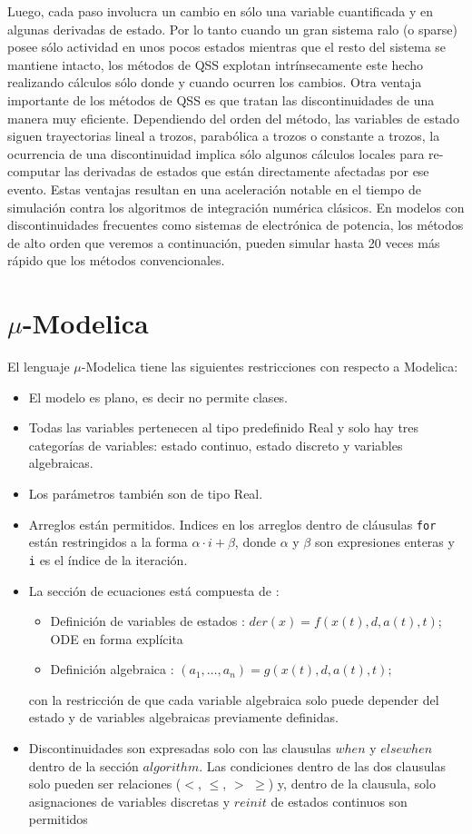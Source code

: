 	Luego, cada paso involucra un cambio en sólo una variable cuantificada y en algunas derivadas de estado. 
	Por lo tanto cuando un gran sistema ralo (o sparse) posee sólo actividad en unos pocos estados mientras que el resto del sistema se mantiene 
	intacto, los métodos de QSS explotan intrínsecamente este hecho realizando cálculos sólo donde y cuando ocurren los cambios.
	Otra ventaja importante de los métodos de QSS es que tratan las discontinuidades de una manera muy eficiente. Dependiendo del orden del método, 
	las variables de estado siguen trayectorias lineal a trozos, parabólica a trozos o constante a trozos, la ocurrencia de una discontinuidad implica 
	sólo algunos cálculos locales para re-computar las derivadas de estados que están directamente afectadas por ese evento.
	Estas ventajas resultan en una aceleración notable en el tiempo de simulación contra los algoritmos de integración numérica clásicos. 
	En modelos con discontinuidades frecuentes como sistemas de electrónica de potencia, los métodos de alto orden que veremos a continuación, 
	pueden simular hasta 20 veces más rápido que los métodos convencionales.


\section{$\mu$-Modelica}
	El lenguaje $\mu$-Modelica tiene las siguientes restricciones con respecto a Modelica:

	\begin{itemize}
	 \item El modelo es plano, es decir no permite clases.
	 \item Todas las variables pertenecen al tipo predefinido Real y solo hay tres categorías de variables: estado continuo, estado discreto y variables 
	algebraicas.
	 \item Los parámetros también son de tipo Real. 
	 \item Arreglos están permitidos. Indices en los arreglos dentro de cláusulas \texttt{for} están restringidos a la forma $\alpha \cdot i + \beta$, 
	donde $\alpha$ y $\beta$ son expresiones enteras y \texttt{i} es el índice de la iteración.
	 \item La sección de ecuaciones está compuesta de :
	 \begin{itemize}
		\item Definición de variables de estados : $der(x) =  f (x(t), d, a(t), t);$ ODE en forma explícita
		\item Definición algebraica : $(a_1 , \dots , a_n ) = g(x(t), d, a(t), t);$
	 \end{itemize}
	 con la restricción de que cada variable algebraica solo puede depender del estado y de variables algebraicas previamente definidas.
	 
	 \item Discontinuidades son expresadas solo con las clausulas $when$ y $elsewhen$ dentro de la sección $algorithm$. Las condiciones dentro de las dos 
	clausulas solo pueden ser relaciones ($<$, $\leqslant$, $>$ $\geqslant$) y, dentro de la clausula, solo asignaciones de variables discretas y $reinit$ 
	de estados continuos son permitidos
	\end{itemize}


